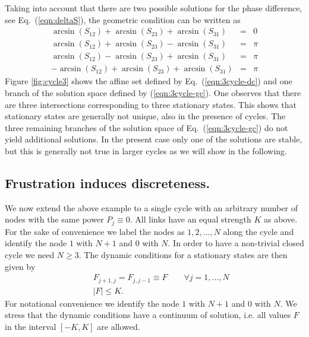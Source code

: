 \documentclass[10pt,aps,pre,preprint,superscriptaddress]{revtex4-1}
\newcommand{\bea}{\begin{eqnarray}}
\newcommand{\eea}{\end{eqnarray}}
\newcommand{\nn}{\nonumber}
\begin{document}
Taking into account that there are two possible solutions for the
phase difference, see Eq.~(\ref{eqn:deltaS}), the geometric condition
can be written as
\bea
      \arcsin(S_{12}) + \arcsin(S_{23}) +  \arcsin(S_{31}) &=& 0    \nn \\ 
      \arcsin(S_{12}) + \arcsin(S_{23})  -  \arcsin(S_{31}) &=& \pi \nn \\ 
      \arcsin(S_{12}) - \arcsin(S_{23})  + \arcsin(S_{31}) &=& \pi \nn \\ 
   - \arcsin(S_{12}) + \arcsin(S_{23})  +  \arcsin(S_{31}) &=& \pi  
   \label{eqn:3cycle-gc} 
\eea 
Figure \ref{fig:cycle3} shows the affine set defined by 
Eq.~(\ref{eqn:3cycle-dc})  and one branch of the solution
space defined by  (\ref{eqn:3cycle-gc}). One observes that 
there are three intersections corresponding to 
three stationary states. This shows that stationary
states are generally not unique, also in the presence
of cycles.
The three remaining branches of the solution space
of Eq.~(\ref{eqn:3cycle-gc}) do not yield additional
solutions.
In the present case only one of the solutions are stable,
but this is generally not true in larger cycles as we will
show in the following.




\subsection{Frustration induces discreteness.} 
\label{eqn:sec-cycle}

We now extend the above example to a single cycle with an arbitrary number 
of nodes with the same power $P_j \equiv 0$. All links have an equal strength 
$K$ as above.
For the sake of convenience we label the nodes as $1,2,\ldots,N$ along the cycle 
and identify the node $1$ with $N+1$ and $0$ with $N$. In order to have a 
non-trivial closed cycle we need $N \ge 3$. 
The dynamic conditions for a stationary states are then given by
\bea
  && F_{j+1,j} = F_{j,j-1}  \equiv F \qquad \forall j = 1,\ldots,N  \\ 
  && |F| \le K.
\eea
For notational convenience we identify the node $1$ with $N+1$ and
$0$ with $N$. We stress that the dynamic conditions have a continuum 
of solution, i.e. all values $F$ in the interval $[-K,K]$ are allowed. 
\end{document}
